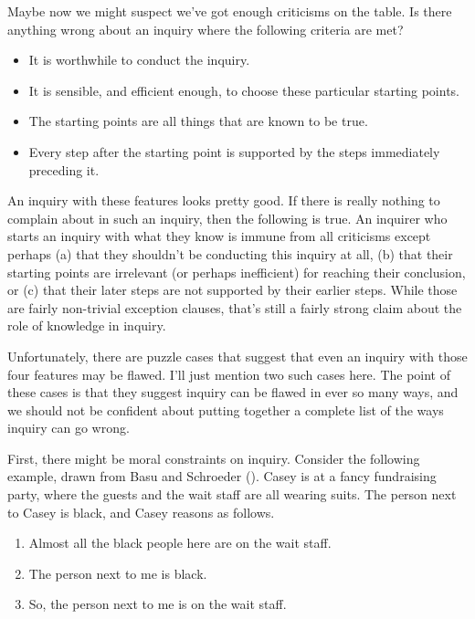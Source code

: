 \documentclass[
  10pt,
  letterpaper,
  twoside]{scrbook}
\providecommand{\tightlist}{%
  \setlength{\itemsep}{0pt}\setlength{\parskip}{0pt}}\usepackage{longtable,booktabs,array}
\begin{document}
Maybe now we might suspect we've got enough criticisms on the table. Is
there anything wrong about an inquiry where the following criteria are
met?

\begin{itemize}
\tightlist
\item
  It is worthwhile to conduct the inquiry.
\item
  It is sensible, and efficient enough, to choose these particular
  starting points.
\item
  The starting points are all things that are known to be true.
\item
  Every step after the starting point is supported by the steps
  immediately preceding it.
\end{itemize}

An inquiry with these features looks pretty good. If there is really
nothing to complain about in such an inquiry, then the following is
true. An inquirer who starts an inquiry with what they know is immune
from all criticisms except perhaps (a) that they shouldn't be conducting
this inquiry at all, (b) that their starting points are irrelevant (or
perhaps inefficient) for reaching their conclusion, or (c) that their
later steps are not supported by their earlier steps. While those are
fairly non-trivial exception clauses, that's still a fairly strong claim
about the role of knowledge in inquiry.

Unfortunately, there are puzzle cases that suggest that even an inquiry
with those four features may be flawed. I'll just mention two such cases
here. The point of these cases is that they suggest inquiry can be
flawed in ever so many ways, and we should not be confident about
putting together a complete list of the ways inquiry can go wrong.

First, there might be moral constraints on inquiry. Consider the
following example, drawn from Basu and Schroeder
(). Casey is at a fancy
fundraising party, where the guests and the wait staff are all wearing
suits. The person next to Casey is black, and Casey reasons as follows.

\begin{enumerate}
\def\labelenumi{\arabic{enumi}.}
\tightlist
\item
  Almost all the black people here are on the wait staff.
\item
  The person next to me is black.
\item
  So, the person next to me is on the wait staff.
\end{enumerate}
\end{document}
